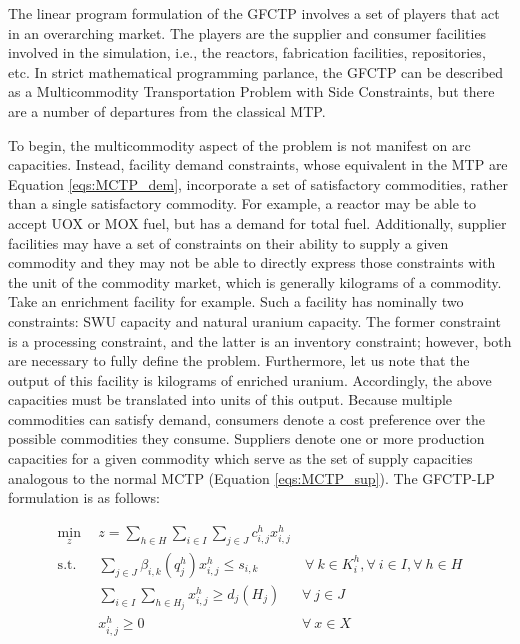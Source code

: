 The linear program formulation of the GFCTP involves a set of players that act
in an overarching market. The players are the supplier and consumer facilities
involved in the simulation, i.e., the reactors, fabrication facilities,
repositories, etc. In strict mathematical programming parlance, the GFCTP can be
described as a Multicommodity Transportation Problem with Side
Constraints, but there are a number of departures from the classical MTP.

To begin, the multicommodity aspect of the problem is not manifest on arc
capacities. Instead, facility demand constraints, whose equivalent in the MTP
are Equation \ref{eqs:MCTP_dem}, incorporate a set of satisfactory commodities,
rather than a single satisfactory commodity. For example, a reactor may be able
to accept UOX or MOX fuel, but has a demand for total fuel. Additionally,
supplier facilities may have a set of constraints on their ability to supply a
given commodity and they may not be able to directly express those constraints
with the unit of the commodity market, which is generally kilograms of a
commodity. Take an enrichment facility for example. Such a facility has
nominally two constraints: SWU capacity and natural uranium capacity. The former
constraint is a processing constraint, and the latter is an inventory
constraint; however, both are necessary to fully define the
problem. Furthermore, let us note that the output of this facility is kilograms
of enriched uranium. Accordingly, the above capacities must be translated into
units of this output. Because multiple commodities can satisfy demand, consumers
denote a cost preference over the possible commodities they consume. Suppliers
denote one or more production capacities for a given commodity which serve as
the set of supply capacities analogous to the normal MCTP
(Equation \ref{eqs:MCTP_sup}). The GFCTP-LP formulation is as follows:

\begin{subequations}\label{eqs:GFCTP-LP}
  \begin{align}
    \min_{z} \:\: & 
    z = \sum_{h \in H}\sum_{i \in I}\sum_{j \in J}c_{i,j}^{h} x_{i,j}^{h} 
    & \label{eqs:GFCTP-LP_obj} \\
    \text{s.t.} \:\: &
    \sum_{j \in J}\beta_{i,k}(q_{j}^{h}) x_{i,j}^{h} \leq s_{i,k} 
    &
    \: \forall \: k \in K_{i}^{h},  
    \forall \: i \in I, \forall \: h \in H \label{eqs:GFCTP-LP_sup} \\
    &
    \sum_{i \in I}\sum_{h \in H_{j}} x_{i,j}^{h} \geq d_{j}(H_{j}) 
    & 
    \forall \: j \in J \label{eqs:GFCTP-LP_dem} \\
    &
    x^h_{i,j} \geq 0
    &
    \forall \: x \in X \label{eqs:GFCTP-LP_x}
  \end{align}
\end{subequations}


